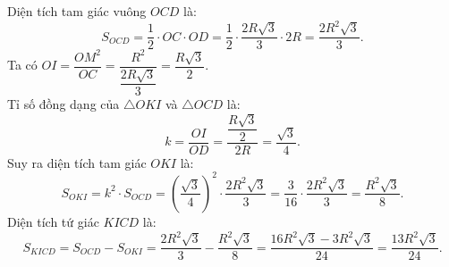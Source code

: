\begin{bt}
{\begin{enumerate}[a)]
    Diện tích tam giác vuông $OCD$ là:
    $$S_{OCD} = \dfrac{1}{2} \cdot OC \cdot OD = \dfrac{1}{2} \cdot \dfrac{2R\sqrt{3}}{3} \cdot 2R = \dfrac{2R^2\sqrt{3}}{3}.$$
    Ta có $OI = \dfrac{OM^2}{OC} = \dfrac{R^2}{\dfrac{2R\sqrt{3}}{3}} = \dfrac{R\sqrt{3}}{2}$.\\
    Tỉ số đồng dạng của $\triangle OKI$ và $\triangle OCD$ là:
    $$k = \dfrac{OI}{OD} = \dfrac{\dfrac{R\sqrt{3}}{2}}{2R} = \dfrac{\sqrt{3}}{4}.$$
    Suy ra diện tích tam giác $OKI$ là:
    $$S_{OKI} = k^2 \cdot S_{OCD} = \left(\dfrac{\sqrt{3}}{4}\right)^2 \cdot \dfrac{2R^2\sqrt{3}}{3} = \dfrac{3}{16} \cdot \dfrac{2R^2\sqrt{3}}{3} = \dfrac{R^2\sqrt{3}}{8}.$$
    Diện tích tứ giác $KICD$ là:
    $$S_{KICD} = S_{OCD} - S_{OKI} = \dfrac{2R^2\sqrt{3}}{3} - \dfrac{R^2\sqrt{3}}{8} = \dfrac{16R^2\sqrt{3} - 3R^2\sqrt{3}}{24} = \dfrac{13R^2\sqrt{3}}{24}.$$
\end{enumerate}
}
\end{bt}

